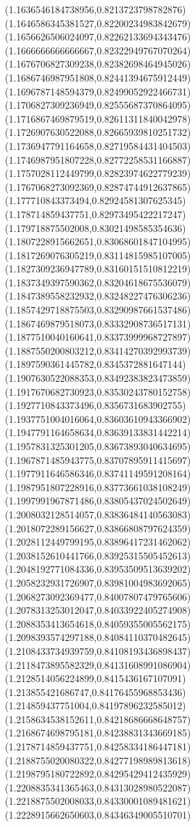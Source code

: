 \documentclass[12pt]{article}
\theoremstyle{plain}
\theoremstyle{definition}
\theoremstyle{remark}
\begin{document}
\begin{figure}
{  (1.1636546184738956,0.8213723798782876)%
  (1.1646586345381527,0.82200234983842679)%
  (1.1656626506024097,0.82262133694343476)%
  (1.1666666666666667,0.82322949767070264)%
  (1.1676706827309238,0.82382698464945026)%
  (1.1686746987951808,0.82441394675912449)%
  (1.1696787148594379,0.82499052922466731)%
  (1.1706827309236949,0.82555687370864095)%
  (1.1716867469879519,0.82611311840042978)%
  (1.1726907630522088,0.82665939810251732)%
  (1.1736947791164658,0.82719584431404503)%
  (1.1746987951807228,0.82772258531166887)%
  (1.1757028112449799,0.82823974622779239)%
  (1.1767068273092369,0.82874744912637865)%
  (1.177710843373494,0.82924581307625345)%
  (1.178714859437751,0.82973495422217247)%
  (1.179718875502008,0.83021498585354636)%
  (1.1807228915662651,0.83068601847104995)%
  (1.1817269076305219,0.83114815985107005)%
  (1.1827309236947789,0.83160151510812219)%
  (1.1837349397590362,0.83204618675536079)%
  (1.1847389558232932,0.83248227476306236)%
  (1.1857429718875503,0.83290987661537486)%
  (1.1867469879518073,0.83332908736517131)%
  (1.1877510040160641,0.83373999968727897)%
  (1.1887550200803212,0.83414270392993739)%
  (1.1897590361445782,0.8345372881647144)%
  (1.1907630522088353,0.83492383823473859)%
  (1.1917670682730923,0.83530243780152758)%
  (1.1927710843373496,0.8356731683902755)%
  (1.1937751004016064,0.83603610943366902)%
  (1.1947791164658634,0.83639133831442214)%
  (1.1957831325301205,0.83673893040634695)%
  (1.1967871485943775,0.83707895911415697)%
  (1.1977911646586346,0.83741149591208164)%
  (1.1987951807228916,0.83773661038108249)%
  (1.1997991967871486,0.83805437024502649)%
  (1.2008032128514057,0.83836484140563083)%
  (1.2018072289156627,0.83866808797624359)%
  (1.2028112449799195,0.83896417231462062)%
  (1.2038152610441766,0.83925315505452613)%
  (1.2048192771084336,0.83953509513639202)%
  (1.2058232931726907,0.83981004983692065)%
  (1.2068273092369477,0.84007807479765606)%
  (1.2078313253012047,0.84033922405274908)%
  (1.2088353413654618,0.84059355005562175)%
  (1.2098393574297188,0.84084110370482645)%
  (1.2108433734939759,0.84108193436898437)%
  (1.2118473895582329,0.84131608991086904)%
  (1.2128514056224899,0.8415436167107091)%
  (1.213855421686747,0.84176455968853436)%
  (1.214859437751004,0.84197896232585012)%
  (1.2158634538152611,0.84218686668648757)%
  (1.2168674698795181,0.84238831343669185)%
  (1.2178714859437751,0.84258334186447181)%
  (1.2188755020080322,0.84277198989813618)%
  (1.2198795180722892,0.84295429412435929)%
  (1.2208835341365463,0.84313028980522087)%
  (1.2218875502008033,0.84330001089481621)%
  (1.2228915662650603,0.84346349005510701)%
}
\end{figure}
\end{document}
